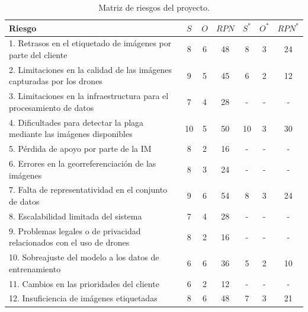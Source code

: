 \documentclass[
11pt, %
]{charter}
\begin{document}
\begin{table}[H]
  \centering
  \begin{tabularx}{\linewidth}{@{}|X|c|c|c|c|c|c|@{}}
    \hline
    \rowcolor[HTML]{C0C0C0}
    Riesgo                                                                   & $S$ & $O$ & $RPN$ & $S^*$ & $O^*$ & $RPN^*$ \\ \hline
    1. Retrasos en el etiquetado de imágenes por parte del cliente           & 8   & 6   & 48    & 8     & 3     & 24      \\ \hline
    2. Limitaciones en la calidad de las imágenes capturadas por los drones  & 9   & 5   & 45    & 6     & 2     & 12      \\ \hline
    3. Limitaciones en la infraestructura para el procesamiento de datos     & 7   & 4   & 28    & -     & -     & -       \\ \hline
    4. Dificultades para detectar la plaga mediante las imágenes disponibles & 10  & 5   & 50    & 10    & 3     & 30      \\ \hline
    5. Pérdida de apoyo por parte de la IM                                   & 8   & 2   & 16    & -     & -     & -       \\ \hline
    6. Errores en la georreferenciación de las imágenes                      & 8   & 3   & 24    & -     & -     & -       \\ \hline
    7. Falta de representatividad en el conjunto de datos                    & 9   & 6   & 54    & 8     & 3     & 24      \\ \hline
    8. Escalabilidad limitada del sistema                                    & 7   & 4   & 28    & -     & -     & -       \\ \hline
    9. Problemas legales o de privacidad relacionados con el uso de drones   & 8   & 2   & 16    & -     & -     & -       \\ \hline
    10. Sobreajuste del modelo a los datos de entrenamiento                  & 6   & 6   & 36    & 5     & 2     & 10      \\ \hline
    11. Cambios en las prioridades del cliente                               & 6   & 2   & 12    & -     & -     & -       \\ \hline
    12. Insuficiencia de imágenes etiquetadas                                & 8   & 6   & 48    & 7     & 3     & 21      \\ \hline
  \end{tabularx}%
  \caption{Matriz de riesgos del proyecto.}
\end{table}
\end{document}
